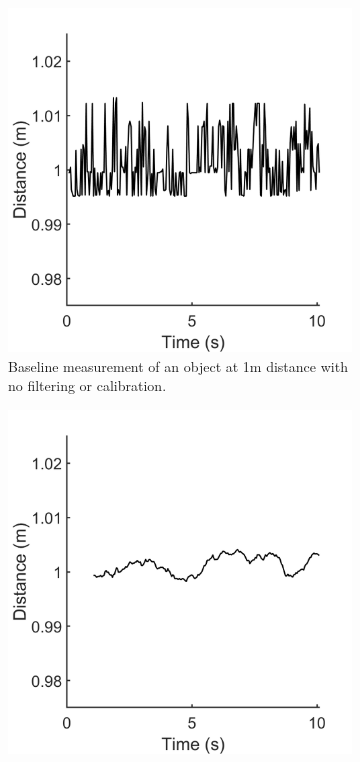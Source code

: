 \documentclass[a4paper,12pt]{article}
\begin{document}
\begin{figure}[htbp]
    \centering
    \begin{subfigure}[b]{0.45\textwidth}
        \centering
        \includegraphics[width=\linewidth]{figs/noRollingAvg.png}
        \caption{Baseline measurement of an object at 1m distance with no filtering or calibration.}
        \label{fig:1mBefore}
    \end{subfigure}\hfill
    \begin{subfigure}[b]{0.45\textwidth}
        \centering
        \includegraphics[width=\linewidth]{figs/withRollingAvg.png}

\end{subfigure}
\end{figure}
\end{document}
